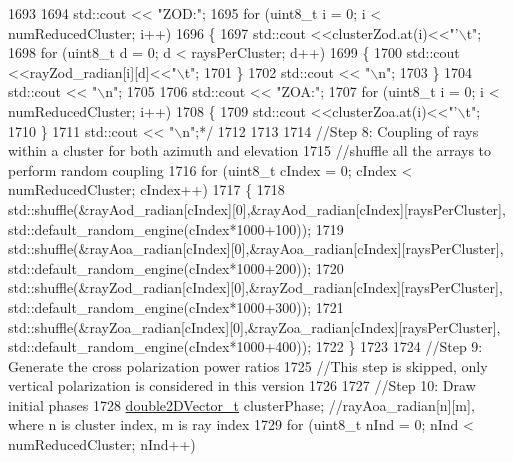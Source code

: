 \begin{DoxyCode}
1693 \textcolor{comment}{}
1694 \textcolor{comment}{        std::cout << "ZOD:";}
1695 \textcolor{comment}{        for (uint8\_t i = 0; i < numReducedCluster; i++)}
1696 \textcolor{comment}{        \{}
1697 \textcolor{comment}{                std::cout <<clusterZod.at(i)<<"'\(\backslash\)t";}
1698 \textcolor{comment}{                for (uint8\_t d = 0; d < raysPerCluster; d++)}
1699 \textcolor{comment}{                \{}
1700 \textcolor{comment}{                        std::cout <<rayZod\_radian[i][d]<<"\(\backslash\)t";}
1701 \textcolor{comment}{                \}}
1702 \textcolor{comment}{                std::cout << "\(\backslash\)n";}
1703 \textcolor{comment}{        \}}
1704 \textcolor{comment}{        std::cout << "\(\backslash\)n";}
1705 \textcolor{comment}{}
1706 \textcolor{comment}{        std::cout << "ZOA:";}
1707 \textcolor{comment}{        for (uint8\_t i = 0; i < numReducedCluster; i++)}
1708 \textcolor{comment}{        \{}
1709 \textcolor{comment}{                std::cout <<clusterZoa.at(i)<<"'\(\backslash\)t";}
1710 \textcolor{comment}{        \}}
1711 \textcolor{comment}{        std::cout << "\(\backslash\)n";*/}
1712 
1713 
1714         \textcolor{comment}{//Step 8: Coupling of rays within a cluster for both azimuth and elevation}
1715         \textcolor{comment}{//shuffle all the arrays to perform random coupling}
1716         \textcolor{keywordflow}{for} (uint8\_t cIndex = 0; cIndex < numReducedCluster; cIndex++)
1717         \{
1718                 std::shuffle(&rayAod\_radian[cIndex][0],&rayAod\_radian[cIndex][raysPerCluster],
      std::default\_random\_engine(cIndex*1000+100));
1719                 std::shuffle(&rayAoa\_radian[cIndex][0],&rayAoa\_radian[cIndex][raysPerCluster],
      std::default\_random\_engine(cIndex*1000+200));
1720                 std::shuffle(&rayZod\_radian[cIndex][0],&rayZod\_radian[cIndex][raysPerCluster],
      std::default\_random\_engine(cIndex*1000+300));
1721                 std::shuffle(&rayZoa\_radian[cIndex][0],&rayZoa\_radian[cIndex][raysPerCluster],
      std::default\_random\_engine(cIndex*1000+400));
1722         \}
1723 
1724         \textcolor{comment}{//Step 9: Generate the cross polarization power ratios}
1725         \textcolor{comment}{//This step is skipped, only vertical polarization is considered in this version}
1726 
1727         \textcolor{comment}{//Step 10: Draw initial phases}
1728         \hyperlink{namespacens3_a908ae777c72964ccedbcf2310527a67e}{double2DVector\_t} clusterPhase; \textcolor{comment}{//rayAoa\_radian[n][m], where n is cluster index, m
       is ray index}
1729         \textcolor{keywordflow}{for} (uint8\_t nInd = 0; nInd < numReducedCluster; nInd++)

\end{DoxyCode}
